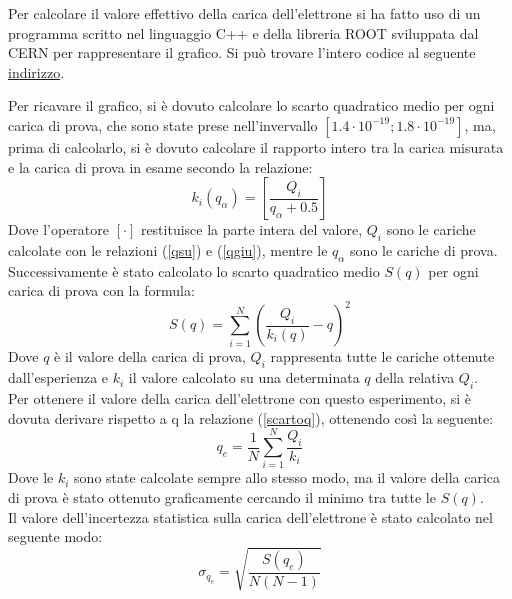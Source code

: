 \documentclass{article}
\begin{document}
Per calcolare il valore effettivo della carica dell'elettrone si ha fatto uso di un programma scritto nel linguaggio C++ e della libreria ROOT sviluppata dal CERN per rappresentare il grafico. Si può trovare l'intero codice al seguente \href{https://github.com/definetly-not-carl/millikan/blob/master/millikan.cpp}{indirizzo}.

Per ricavare il grafico, si è dovuto calcolare lo scarto quadratico medio per ogni carica di prova, che sono state prese nell'invervallo $[1.4\cdot10^{-19};1.8\cdot 10^{-19}]$, ma, prima di calcolarlo, si è dovuto calcolare il rapporto intero tra la carica misurata e la carica di prova in esame secondo la relazione:
\begin{equation}
	k_i(q_\alpha)=\left[\frac{Q_i}{q_{\alpha}+0.5}\right]
\end{equation}
Dove l'operatore $[\cdot]$ restituisce la parte intera del valore, $Q_i$ sono le cariche calcolate con le relazioni (\ref{qsu}) e (\ref{qgiu}), mentre le $q_{\alpha}$ sono le cariche di prova.\\

Successivamente è stato calcolato lo scarto quadratico medio $S(q)$ per ogni carica di prova con la formula:
\begin{equation}
	S(q)=\sum_{i=1}^N\left(\frac{Q_i}{k_i(q)}-q\right)^2
	\label{scartoq}
\end{equation}
Dove $q$ è il valore della carica di prova, $Q_i$ rappresenta tutte le cariche ottenute dall'esperienza e $k_i$ il valore calcolato su una determinata $q$ della relativa $Q_i$.\\

Per ottenere il valore della carica dell'elettrone con questo esperimento, si è dovuta derivare rispetto a q la relazione (\ref{scartoq}), ottenendo così la seguente:
\begin{equation}
	q_e=\frac 1N\sum^N_{i=1}\frac{Q_i}{k_i}
\end{equation}
Dove le $k_i$ sono state calcolate sempre allo stesso modo, ma il valore della carica di prova è stato ottenuto graficamente cercando il minimo tra tutte le $S(q)$.\\

Il valore dell'incertezza statistica sulla carica dell'elettrone è stato calcolato nel seguente modo:
\begin{equation}
	\sigma_{q_e}=\sqrt{\frac{S(q_e)}{N(N-1)}}
	\label{sigmaqe}
\end{equation}\\
\end{document}
